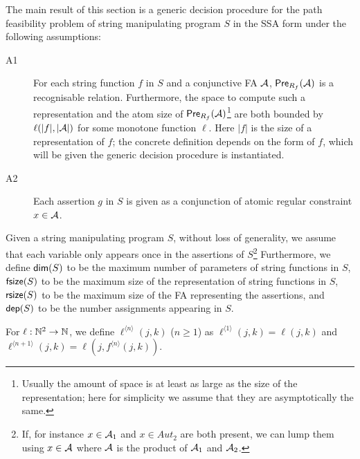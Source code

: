 %

The main result of this section is a generic decision procedure for the path feasibility problem of string manipulating program $S$ in the SSA form under the following assumptions:
\begin{description}
\item[A1] For each string function $f$ in $S$ and a conjunctive FA $\mathcal{A}$,  $\textsf{Pre}_{R_f}(\mathcal{A})$ is a recognisable relation. Furthermore, the space to compute such a representation and the atom size of $\textsf{Pre}_{R_f}(\mathcal{A})$\footnote{Usually the amount of space is at least as large as the size of the representation; here for simplicity we assume that they are asymptotically the same.} are both bounded by $\ell(|f|, |\mathcal{A}|)$ for some monotone function $\ell$. Here $|f|$ is the size of a representation of $f$; the concrete definition depends on the form of $f$, which will be given the generic decision procedure is instantiated.  

\item[A2] Each assertion $g$ in $S$ is given as a conjunction of atomic regular constraint $x\in \mathcal{A}$. 
\end{description} 

Given a string manipulating program $S$, without loss of generality, we assume that each variable only appears once in the assertions of $S$\footnote{If, for instance $x\in \mathcal{A}_1$ and $x\in Aut_2$ are both present, we can lump them using $x\in \mathcal{A}$ where $\mathcal{A}$ is the product of $\mathcal{A}_1$ and $\mathcal{A}_2$.} Furthermore, we define $\mathsf{dim}(S)$ to be the maximum number of parameters of string functions in $S$, $\mathsf{fsize}(S)$ to be the maximum size of the representation of string functions in $S$, $\mathsf{rsize}(S)$ to be the maximum size of the FA representing the assertions,  and $\mathsf{dep}(S)$  to be the number assignments appearing in $S$. 




For $\ell:\mathbb{N}^2\rightarrow \mathbb{N}$, we define $\ell^{\langle n \rangle}(j, k)$ ($n\geq 1$) as $\ell^{\langle 1 \rangle}(j,k)= \ell(j, k)$ and $\ell^{\langle n+1 \rangle }(j, k) = \ell(j, f^{\langle n \rangle}(j,k))$. 

